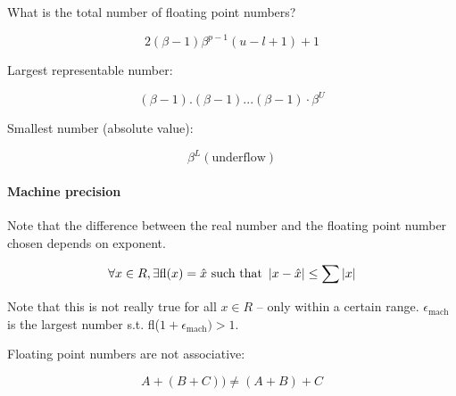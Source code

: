 What is the total number of floating point numbers?

\[
	2(\beta - 1) \beta^{p-1} (u-l+1) + 1
\]

Largest representable number:

\[
	(\beta - 1).(\beta - 1)...(\beta - 1) \cdot \beta^U
\]

Smallest number (absolute value):

\[
	\beta^L (\text{underflow})
\]

\paragraph{Machine precision} Note that the difference between the real number and the floating point number chosen depends on exponent.

\[
	\forall x \in R, \exists \text{fl}(x) = \hat{x} \text{ such that } \left|x-\hat{x}\right| \leq \sum \left|x\right|
\]

Note that this is not really true for all $x \in R$ -- only within a certain range. $\epsilon_{\text{mach}}$ is the largest number s.t. fl($1 + \epsilon_{\text{mach}}) > 1$.

Floating point numbers are not associative:

\[
	A+(B+C)) \not= (A+B)+C
\]